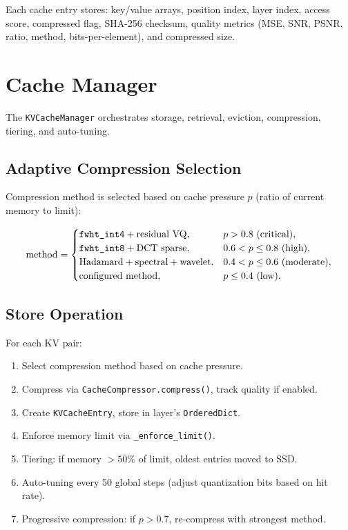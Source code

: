 \documentclass[11pt,a4paper,openright]{book}
\begin{document}
Each cache entry stores: key/value arrays, position index, layer index, access score, compressed flag, SHA-256 checksum, quality metrics (MSE, SNR, PSNR, ratio, method, bits-per-element), and compressed size.

\section{Cache Manager}

The \texttt{KVCacheManager} orchestrates storage, retrieval, eviction, compression, tiering, and auto-tuning.

\subsection{Adaptive Compression Selection}

Compression method is selected based on cache pressure $p$ (ratio of current memory to limit):

\begin{equation}
	\label{eq:cache_pressure}
	\text{method} =
	\begin{cases}
		\text{\texttt{fwht\_int4}} + \text{residual VQ},    & p > 0.8\ \text{(critical)},         \\
		\text{\texttt{fwht\_int8}} + \text{DCT sparse},     & 0.6 < p \le 0.8\ \text{(high)},     \\
		\text{Hadamard} + \text{spectral} + \text{wavelet}, & 0.4 < p \le 0.6\ \text{(moderate)}, \\
		\text{configured method},                           & p \le 0.4\ \text{(low)}.
	\end{cases}
\end{equation}

\subsection{Store Operation}

For each KV pair:
\begin{enumerate}
	\item Select compression method based on cache pressure.
	\item Compress via \texttt{CacheCompressor.compress()}, track quality if enabled.
	\item Create \texttt{KVCacheEntry}, store in layer's \texttt{OrderedDict}.
	\item Enforce memory limit via \texttt{\_enforce\_limit()}.
	\item Tiering: if memory $>50\%$ of limit, oldest entries moved to SSD.
	\item Auto-tuning every 50 global steps (adjust quantization bits based on hit rate).
	\item Progressive compression: if $p > 0.7$, re-compress with strongest method.
\end{enumerate}
\end{document}

